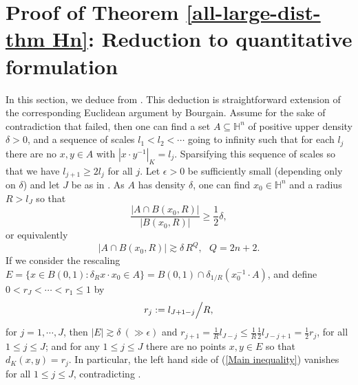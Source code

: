 \documentclass[11pt, reqno]{amsart}
\theoremstyle{plain}
\theoremstyle{remark}
\theoremstyle{example}
\theoremstyle{definition}
\numberwithin{equation}{section}
\begin{document}
\section{Proof of Theorem \ref{all-large-dist-thm Hn}: Reduction to quantitative formulation}\label{mainresultproof}
In this section, we deduce  from . This deduction  is straightforward extension of the corresponding Euclidean argument by Bourgain. Assume for the sake of contradiction that  failed, then one can find a set $A \subseteq \mathbb{H}^n$ of positive upper density $\delta>0$, and a sequence of scales $l_{1}< l_{2}< \cdots$ going to  infinity such that for each $l_{j}$ there are no $x,y \in A$ with $|x \cdot y^{-1}|_{K}= l_{j}$. Sparsifying this sequence of scales so that we have $l_{j+1} \geq 2l_{j}$ for all $j$. Let $\epsilon>0$ be sufficiently small (depending only on $\delta$) and let $J$ be as in . As $A$ has density $\delta$, one can find $x_0\in \mathbb H^n$ and  a radius $R> l_{J}$ so that 
\begin{equation*}
    \frac{|A \cap B(x_0,R)|}{|B(x_0,R)|}\geq \frac{1}{2} \delta,
\end{equation*}
or equivalently
\begin{equation*}
    |A \cap B(x_0,R)| \gtrsim \delta \, R^{Q}, \ \ \ Q=2n+2.
\end{equation*}
If we consider the rescaling $E=\lbrace x \in B(0,1) : \delta_{R}x\cdot x_0 \in A  \rbrace = B(0,1) \cap \delta_{1/R}\left( x_0^{-1} \cdot A \right)$, and define $0< r_{J}<\cdots <r_{1} \leq 1$ by
\begin{equation*}
    r_{j}:= l_{J+1-j} \Big{/} R,
\end{equation*}
for $j=1, \cdots, J$, then $|E| \gtrsim \delta  \ (\gg \epsilon)$ and $r_{j+1}= \frac{1}{R} l_{J-j} \leq \frac{1}{R} \frac{1}{2} l_{J-j+1}= \frac{1}{2} r_{j}$, for all $1 \leq j \leq J$; and for any $1 \leq j \leq J$ there are no points $x, y \in E$ so that $d_K(x,y)=r_{j}$.  In particular, the left hand side of (\ref{Main inequality}) vanishes for all $1 \leq j \leq J$,  contradicting .
\end{document}
